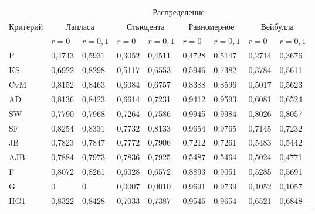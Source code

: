\begin{table*}\small  %
\begin{center}
\parbox{370pt}{
}

\vspace*{2ex}

\begin{tabular}{|l|l|l|l|l|l|l|l|l|}
\hline
 & \multicolumn{8}{c|}{Распределение}\\
\cline{2-9}
\multicolumn{1}{|c|}{Критерий}&\multicolumn{2}{c|}{Лапласа}&\multicolumn{2}{c|}{Стьюдента}&\multicolumn{2}{c|}{Равномерное}&\multicolumn{2}{c|}{Вейбулла}\\
\cline{2-9}
&$r=0$&$r=0{,}1$&$r=0$&$r=0{,}1$&$r=0$&$r=0{,}1$&$r=0$&$r=0{,}1$\\
\hline
\hspace*{4mm}P&0,4743&0,5931&0,3052&0,4511&0,4728&0,5147&0,2714&0,3676\\
\hspace*{4mm}KS&0,6922&0,8298&0,5117&0,6553&0,5946&0,7382&0,3784&0,5611\\
\hspace*{4mm}CvM&0,8152&0,8463&0,6084&0,6757&0,8388&0,8596&0,5017&0,5623\\
\hspace*{4mm}AD&0,8136&0,8423&0,6614&0,7231&0,9412&0,9593&0,6081&0,6524\\
\hspace*{4mm}SW&0,7790&0,7968&0,7264&0,7586&0,9945&0,9984&0,8026&0,8057\\
\hspace*{4mm}SF&0,8254&0,8331&0,7732&0,8133&0,9654&0,9765&0,7145&0,7232\\
\hspace*{4mm}JB&0,7823&0,7847&0,7772&0,7906&0,7212&0,7261&0,5483&0,5442\\
\hspace*{4mm}AJB&0,7884&0,7973&0,7836&0,7925&0,5487&0,5464&0,5024&0,4771\\
\hspace*{4mm}F&0,8072&0,8261&0,6028&0,6572&0,8893&0,9051&0,5285&0,5691\\
\hspace*{4mm}G&0&0&0,0007&0,0010&0,9691&0,9739&0,1052&0,1057\\
\hspace*{4mm}HG1&0,8322&0,8428&0,7033&0,7387&0,9546&0,9654&0,6521&0,6848\\

\end{tabular}
\end{center}
\end{table*}
